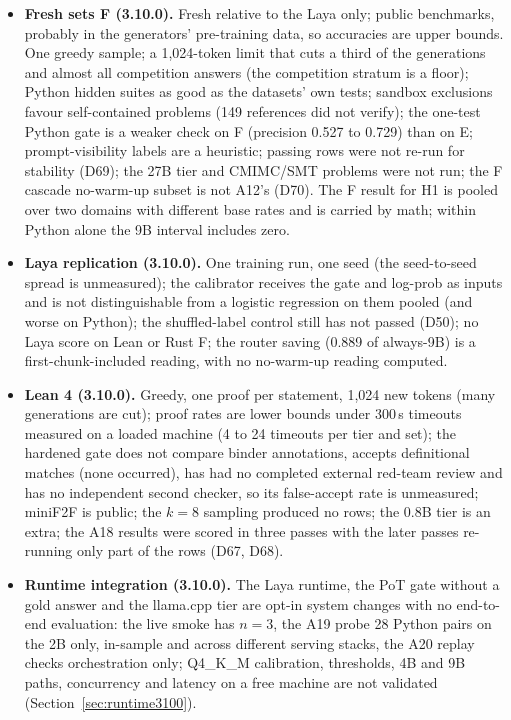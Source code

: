 \documentclass[11pt,a4paper]{article}
\begin{document}
\begin{itemize}
\item \textbf{Fresh sets F (3.10.0).} Fresh relative to the Laya only; public benchmarks, probably in the generators' pre-training data, so accuracies are upper bounds. One greedy sample; a 1,024-token limit that cuts a third of the generations and almost all competition answers (the competition stratum is a floor); Python hidden suites as good as the datasets' own tests; sandbox exclusions favour self-contained problems (149 references did not verify); the one-test Python gate is a weaker check on F (precision 0.527 to 0.729) than on E; prompt-visibility labels are a heuristic; passing rows were not re-run for stability (D69); the 27B tier and CMIMC/SMT problems were not run; the F cascade no-warm-up subset is not A12's (D70). The F result for H1 is pooled over two domains with different base rates and is carried by math; within Python alone the 9B interval includes zero.
\item \textbf{Laya replication (3.10.0).} One training run, one seed (the seed-to-seed spread is unmeasured); the calibrator receives the gate and log-prob as inputs and is not distinguishable from a logistic regression on them pooled (and worse on Python); the shuffled-label control still has not passed (D50); no Laya score on Lean or Rust F; the router saving (0.889 of always-9B) is a first-chunk-included reading, with no no-warm-up reading computed.
\item \textbf{Lean 4 (3.10.0).} Greedy, one proof per statement, 1,024 new tokens (many generations are cut); proof rates are lower bounds under 300\,s timeouts measured on a loaded machine (4 to 24 timeouts per tier and set); the hardened gate does not compare binder annotations, accepts definitional matches (none occurred), has had no completed external red-team review and has no independent second checker, so its false-accept rate is unmeasured; miniF2F is public; the $k=8$ sampling produced no rows; the 0.8B tier is an extra; the A18 results were scored in three passes with the later passes re-running only part of the rows (D67, D68).
\item \textbf{Runtime integration (3.10.0).} The Laya runtime, the PoT gate without a gold answer and the llama.cpp tier are opt-in system changes with no end-to-end evaluation: the live smoke has $n=3$, the A19 probe 28 Python pairs on the 2B only, in-sample and across different serving stacks, the A20 replay checks orchestration only; Q4\_K\_M calibration, thresholds, 4B and 9B paths, concurrency and latency on a free machine are not validated (Section~\ref{sec:runtime3100}).

\end{itemize}
\end{document}

